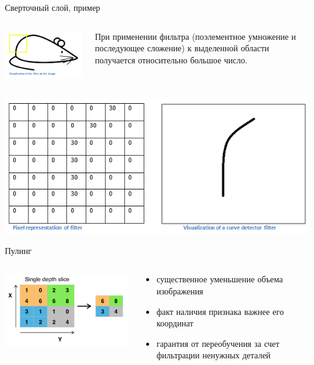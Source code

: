 \documentclass[unicode,aspectratio=43]{beamer}
\begin{document}
\begin{frame}{Сверточный слой, пример}
	\begin{columns}
		\begin{column}{.5\textwidth}
			\includegraphics[scale=0.5]{3}
		\end{column}
		\begin{column}{.5\textwidth}
			При применении фильтра (поэлементное умножение и последующее сложение) к выделенной области получается относительно большое число. 
		\end{column}
	\end{columns}
	\includegraphics[scale=0.4]{2}
\end{frame}

\begin{frame}{Пулинг}
		\begin{columns}
			\begin{column}{.5\textwidth}
				\includegraphics[scale=0.55]{max_pooling.png}
			\end{column}
			\begin{column}{.5\textwidth}
				\begin{itemize}
					\item существенное уменьшение объема изображения
					\item факт наличия признака важнее его координат
					\item гарантия от переобучения за счет фильтрации ненужных деталей
				\end{itemize}
			\end{column}
		\end{columns}
\end{frame}
\end{document}
